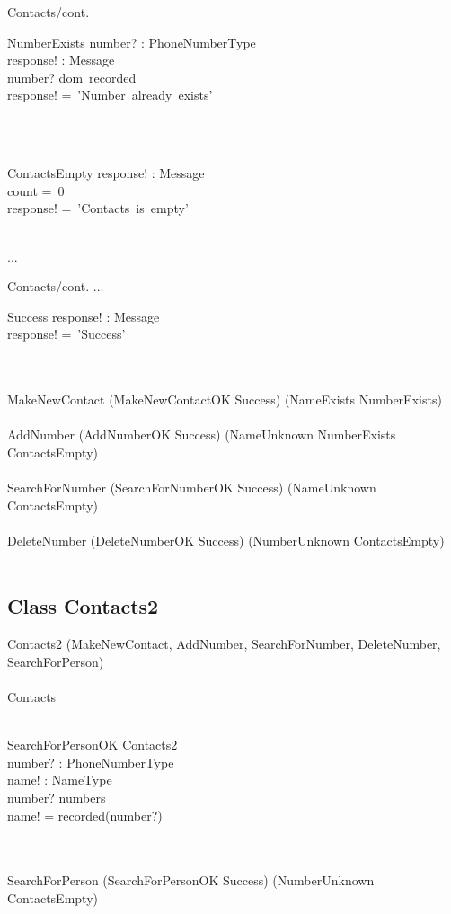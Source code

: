 \documentclass[12pt]{article}
\begin{document}
\begin{spacing}{1.5}
\begin{class}{Contacts/cont.}
\begin{op}{NumberExists}
number? : PhoneNumberType\\
response! : Message\\
\ST
number? \in dom~recorded\\
response! =~'Number~already~exists'
\end{op}\\
\\
\begin{op}{ContactsEmpty}
response! : Message\\
\ST
count =~0\\
response! =~'Contacts~is~empty'
\end{op}\\
...
\end{class}
\newpage
\begin{class}{Contacts/cont.}
...
\also
\begin{op}{Success}
response! : Message\\
\ST
response! =~'Success'
\end{op}\\
\mbox{}\\
MakeNewContact \sdef (MakeNewContactOK \land Success) \oplus (NameExists \lor NumberExists)  \\
\mbox{}\\
AddNumber \sdef (AddNumberOK \land Success) \oplus (NameUnknown \lor NumberExists \lor ContactsEmpty)  \\
\mbox{}\\
SearchForNumber \sdef (SearchForNumberOK \land Success) \oplus (NameUnknown \lor ContactsEmpty)  \\
\mbox{}\\
DeleteNumber \sdef (DeleteNumberOK \land Success) \oplus (NumberUnknown \lor ContactsEmpty)  \\
\mbox{}\\
\end{class}
\newpage
\subsection{Class Contacts2}
\begin{class}{Contacts2}
\also
\upharpoonright (MakeNewContact, AddNumber, SearchForNumber, DeleteNumber, \\
SearchForPerson) 
\\~\\ Contacts  \\~\\
\begin{op}{SearchForPersonOK}
\Xi Contacts2\\
number? : PhoneNumberType\\
name! : NameType\\
\ST
number? \in numbers\\
name! = recorded(number?)
\end{op}\\
\mbox{}\\
SearchForPerson \sdef (SearchForPersonOK \land Success) \oplus (NumberUnknown \lor ContactsEmpty)  \\
\mbox{}\\
\end{class}


\end{spacing}
\end{document}
